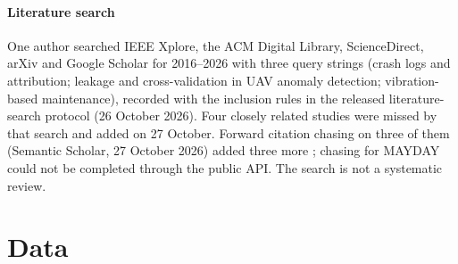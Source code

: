 \documentclass[preprint,12pt]{elsarticle}
\begin{document}
\paragraph{Literature search} One author searched IEEE Xplore, the ACM Digital Library, ScienceDirect, arXiv and Google Scholar for 2016--2026 with three query strings (crash logs and attribution; leakage and cross-validation in UAV anomaly detection; vibration-based maintenance), recorded with the inclusion rules in the released literature-search protocol (26 October 2026). Four closely related studies \cite{kim2020mayday,mantas2019gryphon,wang2024loganomaly,vieira2025bearing} were missed by that search and added on 27 October. Forward citation chasing on three of them (Semantic Scholar, 27 October 2026) added three more \cite{hakani2025battery,seong2026flightlog,li2026ufa}; chasing for MAYDAY could not be completed through the public API. The search is not a systematic review.

\section{Data}
\label{sec:data}
\end{document}
